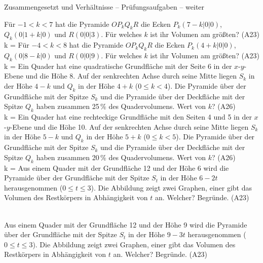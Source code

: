 \begin{aufgabe}{Zusammengesetzt und Verhältnisse – Prüfungsaufgaben – weiter}
\begin{teile}
\teil Für $-1 < k < 7$ hat die Pyramide $OP_kQ_kR$ die Ecken $P_k(7 - k | 0 | 0)$, $Q_k(0 | 1 + k | 0)$ und $R(0 | 0 | 3)$. Für welches $k$ ist ihr Volumen am größten? \hfill (A23) \\ k = \leerfeld
\teil Für $-4 < k < 8$ hat die Pyramide $OP_kQ_kR$ die Ecken $P_k(4 + k | 0 | 0)$, $Q_k(0 | 8 - k | 0)$ und $R(0 | 0 | 9)$. Für welches $k$ ist ihr Volumen am größten? \hfill (A23) \\ k = \leerfeld
\teil Ein Quader hat eine quadratische Grundfläche mit der Seite 6 in der $x$-$y$-Ebene und die Höhe 8. Auf der senkrechten Achse durch seine Mitte liegen $S_k$ in der Höhe $4 - k$ und $Q_k$ in der Höhe $4 + k$ ($0 \le k < 4$). Die Pyramide über der Grundfläche mit der Spitze $S_k$ und die Pyramide über der Deckfläche mit der Spitze $Q_k$ haben zusammen 25\,\% des Quadervolumens. Wert von $k$? \hfill (A26) \\ k = \leerfeld
\teil Ein Quader hat eine rechteckige Grundfläche mit den Seiten 4 und 5 in der $x$-$y$-Ebene und die Höhe 10. Auf der senkrechten Achse durch seine Mitte liegen $S_k$ in der Höhe $5 - k$ und $Q_k$ in der Höhe $5 + k$ ($0 \le k < 5$). Die Pyramide über der Grundfläche mit der Spitze $S_k$ und die Pyramide über der Deckfläche mit der Spitze $Q_k$ haben zusammen 20\,\% des Quadervolumens. Wert von $k$? \hfill (A26) \\ k = \leerfeld
\teil Aus einem Quader mit der Grundfläche 12 und der Höhe 6 wird die Pyramide über der Grundfläche mit der Spitze $S_t$ in der Höhe $6 - 2t$ herausgenommen ($0 \le t \le 3$). Die Abbildung zeigt zwei Graphen, einer gibt das Volumen des Restkörpers in Abhängigkeit von $t$ an. Welcher? Begründe. \hfill (A23) \\  \\ 

\begin{ksys}[xmin=0,xmax=4,ymin=0,ymax=80,xstep=1,ystep=10,xlabel=t,ylabel=V]   \end{ksys}
\teil Aus einem Quader mit der Grundfläche 12 und der Höhe 9 wird die Pyramide über der Grundfläche mit der Spitze $S_t$ in der Höhe $9 - 3t$ herausgenommen ($0 \le t \le 3$). Die Abbildung zeigt zwei Graphen, einer gibt das Volumen des Restkörpers in Abhängigkeit von $t$ an. Welcher? Begründe. \hfill (A23) \\  \\ 

\begin{ksys}[xmin=0,xmax=4,ymin=0,ymax=120,xstep=1,ystep=20,xlabel=t,ylabel=V]   \end{ksys}
\end{teile}
\end{aufgabe}


